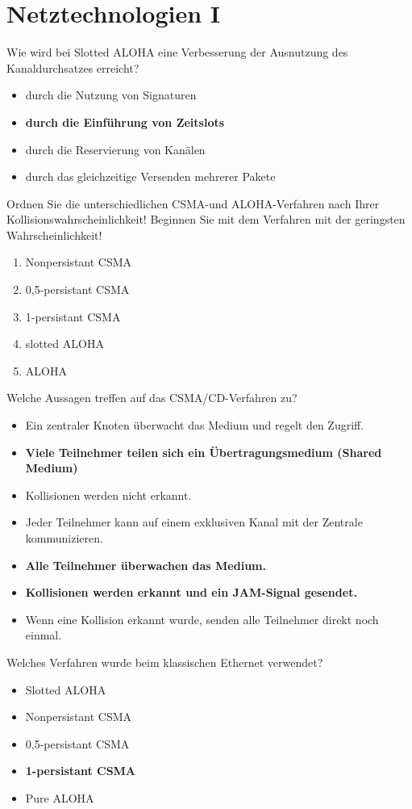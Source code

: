 \documentclass{article}
\begin{document}
	\section{Netztechnologien I}
	
	Wie wird bei Slotted ALOHA eine Verbesserung der Ausnutzung des Kanaldurchsatzes erreicht? 
	\begin{itemize}
		\item durch die Nutzung von Signaturen
		\item \textbf{durch die Einführung von Zeitslots}
		\item durch die Reservierung von Kanälen
		\item durch das gleichzeitige Versenden mehrerer Pakete 
	\end{itemize}

	Ordnen Sie die unterschiedlichen CSMA-und ALOHA-Verfahren nach Ihrer Kollisionswahrscheinlichkeit! Beginnen Sie mit dem Verfahren mit der geringsten Wahrscheinlichkeit! 
	\begin{enumerate}
		\item Nonpersistant CSMA
		\item 0,5-persistant CSMA 
		\item 1-persistant CSMA
		\item slotted ALOHA
		\item ALOHA
	\end{enumerate}

	Welche Aussagen treffen auf das CSMA/CD-Verfahren zu? 
	\begin{itemize}
		\item Ein zentraler Knoten überwacht das Medium und regelt den Zugriff.
		\item \textbf{Viele Teilnehmer teilen sich ein Übertragungsmedium (Shared Medium)}
		\item Kollisionen werden nicht erkannt.
		\item Jeder Teilnehmer kann auf einem exklusiven Kanal mit der Zentrale kommunizieren.
		\item \textbf{Alle Teilnehmer überwachen das Medium.}
		\item \textbf{Kollisionen werden erkannt und ein JAM-Signal gesendet.}
		\item Wenn eine Kollision erkannt wurde, senden alle Teilnehmer direkt noch einmal.
	\end{itemize}

	Welches Verfahren wurde beim klassischen Ethernet verwendet? 
	\begin{itemize}
		\item Slotted ALOHA
		\item Nonpersistant CSMA
		\item 0,5-persistant CSMA
		\item \textbf{1-persistant CSMA}
		\item Pure ALOHA
	\end{itemize}
\end{document}

